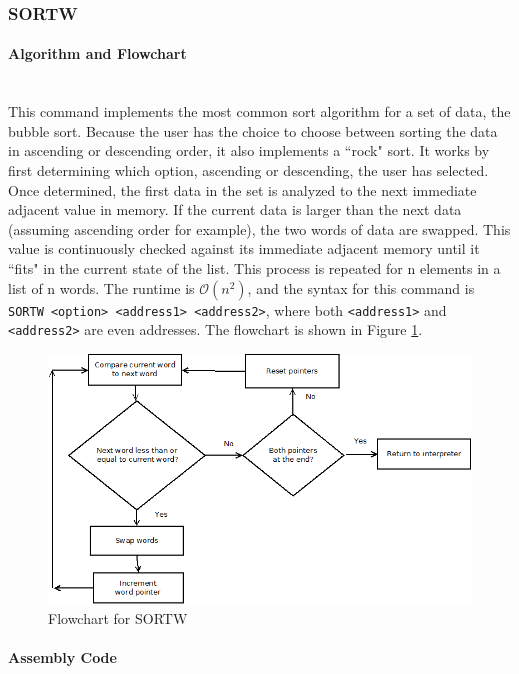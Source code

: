 \documentclass[12pt]{article}
\begin{document}
			\subsubsection{SORTW}
			
			\paragraph{Algorithm and Flowchart}~\\
			This command implements the most common sort algorithm for a set of data, the bubble sort. Because the user has the choice to choose between sorting the data in ascending or descending order, it also implements a ``rock" sort. It works by first determining which option, ascending or descending, the user has selected. Once determined, the first data in the set is analyzed to the next immediate adjacent value in memory. If the current data is larger than the next data (assuming ascending order for example), the two words of data are swapped. This value is continuously checked against its immediate adjacent memory until it ``fits" in the current state of the list. This process is repeated for n elements in a list of n words. The runtime is $\mathcal{O}(n^2)$, and the syntax for this command is \texttt{SORTW <option> <address1> <address2>}, where both \texttt{<address1>} and \texttt{<address2>} are even addresses. The flowchart is shown in Figure \ref{fig:SORTW}.
			
			
\begin{figure}[H]
\centering
\includegraphics[width=0.7\linewidth]{SORTW}
\caption{Flowchart for SORTW}
\label{fig:SORTW}
\end{figure}
			\paragraph{Assembly Code}~\\
			
			
\end{document}
